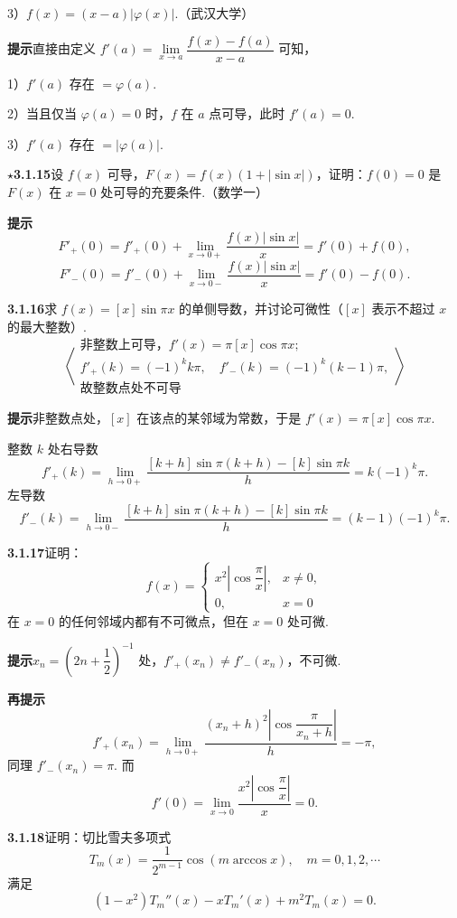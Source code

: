 \documentclass[UTF8,12pt,a4paper,fontset=fandol]{ctexart}
\begin{document}
3）$f(x)=(x-a)|\varphi(x)|$.（武汉大学）

\noindent\textbf{提示}\quad 直接由定义 $f'(a)=\lim\limits_{x\to a}\dfrac{f(x)-f(a)}{x-a}$ 可知，

1）$f'(a)$ 存在 $=\varphi(a)$.

2）当且仅当 $\varphi(a)=0$ 时，$f$ 在 $a$ 点可导，此时 $f'(a)=0$.

3）$f'(a)$ 存在 $=|\varphi(a)|$.

\noindent\textbf{$\star$3.1.15}\quad 设 $f(x)$ 可导，$F(x)=f(x)(1+|\sin x|)$，证明：$f(0)=0$ 是 $F(x)$ 在 $x=0$ 处可导的充要条件.（数学一）

\noindent\textbf{提示}\quad
\[
  F'_+(0)=f'_+(0)+\lim_{x\to0+}\frac{f(x)|\sin x|}{x}=f'(0)+f(0),
\]
\[
  F'_-(0)=f'_-(0)+\lim_{x\to0-}\frac{f(x)|\sin x|}{x}=f'(0)-f(0).
\]

\noindent\textbf{3.1.16}\quad 求 $f(x)=[x]\sin\pi x$ 的单侧导数，并讨论可微性（$[x]$ 表示不超过 $x$ 的最大整数）.
\[
  \left\langle
  \begin{array}{l}
  \text{非整数上可导，}f'(x)=\pi[x]\cos\pi x;\\
  f'_+(k)=(-1)^kk\pi,\quad f'_-(k)=(-1)^k(k-1)\pi,\\
  \text{故整数点处不可导}
  \end{array}
  \right\rangle
\]

\noindent\textbf{提示}\quad 非整数点处，$[x]$ 在该点的某邻域为常数，于是 $f'(x)=\pi[x]\cos\pi x$.

整数 $k$ 处右导数
\[
  f'_+(k)=\lim_{h\to0+}\frac{[k+h]\sin\pi(k+h)-[k]\sin\pi k}{h}
  =k(-1)^k\pi.
\]
左导数
\[
  f'_-(k)=\lim_{h\to0-}\frac{[k+h]\sin\pi(k+h)-[k]\sin\pi k}{h}
  =(k-1)(-1)^k\pi.
\]

\noindent\textbf{3.1.17}\quad 证明：
\[
  f(x)=
  \begin{cases}
  x^2\left|\cos\dfrac{\pi}{x}\right|, & x\ne0,\\
  0, & x=0
  \end{cases}
\]
在 $x=0$ 的任何邻域内都有不可微点，但在 $x=0$ 处可微.

\noindent\textbf{提示}\quad $x_n=\left(2n+\dfrac12\right)^{-1}$ 处，$f'_+(x_n)\ne f'_-(x_n)$，不可微.

\noindent\textbf{再提示}\quad
\[
  f'_+(x_n)=\lim_{h\to0+}\frac{(x_n+h)^2\left|\cos\dfrac{\pi}{x_n+h}\right|}{h}=-\pi,
\]
同理 $f'_-(x_n)=\pi$. 而
\[
  f'(0)=\lim_{x\to0}\frac{x^2\left|\cos\dfrac{\pi}{x}\right|}{x}=0.
\]

\noindent\textbf{3.1.18}\quad 证明：切比雪夫多项式
\[
  T_m(x)=\frac{1}{2^{m-1}}\cos(m\arccos x),\quad m=0,1,2,\cdots
\]
满足
\[
  (1-x^2)T_m''(x)-xT_m'(x)+m^2T_m(x)=0.
\]
\end{document}
